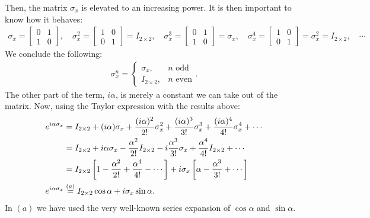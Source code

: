 \documentclass[letterpaper,11pt,twoside]{article}
\begin{document}
Then, the matrix $\sigma_x$ is elevated to an increasing power. It is then important to know how it behaves:
\begin{align*}
  \sigma_x=\begin{bmatrix}
    0&1\\1&0
  \end{bmatrix},\quad\sigma_x^2=\begin{bmatrix}
    1&0\\0&1
  \end{bmatrix}=I_{2\times2},\quad\sigma_x^3=\begin{bmatrix}
    0&1\\1&0
  \end{bmatrix}=\sigma_x,\quad \sigma_x^4=\begin{bmatrix}
    1&0\\0&1
  \end{bmatrix}=\sigma_x^2=I_{2\times2},\quad\cdots
\end{align*}
We conclude the following:
\begin{align*}
  \sigma^n_x=\begin{cases}
    \sigma_x,&\text{$n$ odd}\\
    I_{2\times2},&\text{$n$ even}
  \end{cases}.
\end{align*}
The other part of the term, $i\alpha$, is merely a constant we can take out of the matrix. Now, using the Taylor expression with the results above:
\begin{align}
  e^{i\alpha\sigma_x}&=I_{2\times2}+(i\alpha)\sigma_x+\frac{(i\alpha)^2}{2!}\sigma_x^2+\frac{(i\alpha)^3}{3!}\sigma_x^3+\frac{(i\alpha)^4}{4!}\sigma_x^4+\cdots\notag\\
  &=I_{2\times2}+i\alpha\sigma_x-\frac{\alpha^2}{2!}I_{2\times2}-i\frac{\alpha^3}{3!}\sigma_x+\frac{\alpha^4}{4!}I_{2\times2}+\cdots\notag\\
  &=I_{2\times2}\left[1-\frac{\alpha^2}{2!}+\frac{\alpha^4}{4!}-\cdots\right]+i\sigma_x\left[\alpha-\frac{\alpha^3}{3!}+\cdots\right]\notag\\
  e^{i\alpha\sigma_x}&\stackrel{(a)}{=}I_{2\times2}\cos\alpha+i\sigma_x\sin\alpha.
\end{align}
In $(a)$ we have used the very well-known series expansion of $\cos\alpha$ and $\sin\alpha$.
%
\end{document}
